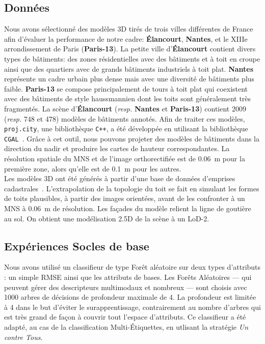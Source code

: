     \subsection*{Données}
        Nous avons sélectionné des modèles 3D tirés de trois villes différentes de France afin d'évaluer la performance de notre cadre: \textbf{\'Elancourt}, \textbf{Nantes}, et le XIIIe arrondissement de Paris (\textbf{Paris-13}).
        La petite ville d'\textbf{\'Elancourt} contient divers types de bâtiments: des zones résidentielles avec des bâtiments et à toit en croupe ainsi que des quartiers avec de grands bâtiments industriels à toit plat.
        \textbf{Nantes} représente un cadre urbain plus dense mais avec une diversité de bâtiments plus faible.
        \textbf{Paris-13} se compose principalement de tours à toit plat qui coexistent avec des bâtiments de style haussmannien dont les toits sont généralement très fragmentés.
        La scène d'\textbf{\'Elancourt} (\textit{resp.} \textbf{Nantes} et \textbf{Paris-13}) contient \num[locale=FR]{2009} (\textit{resp.} \num[locale=FR]{748} et \num[locale=FR]{478}) modèles de bâtiments annotés.
        Afin de traiter ces modèles, \verb!proj.city!, une bibliothèque \verb!C++!, a été développée en utilisant la bibliothèque \verb!CGAL!~\parencite{fabri2000design}.
        Grâce à cet outil, nous pouvons projeter des modèles de bâtiments dans la direction du nadir et produire les cartes de hauteur correspondantes.
        La résolution spatiale du MNS et de l'image orthorectifiée est de \SI[locale=FR]{0.06}{\m} pour la première zone, alors qu'elle est de \SI[locale=FR]{0.1}{\m} pour les autres.\\

        Les modèles 3D ont été générés à partir d'une base de données d'emprises cadastrales~\parencite{durupt2006automatic}.
        L'extrapolation de la topologie du toit se fait en simulant les formes de toits plausibles, à partir des images orientées, avant de les confronter à un MNS à \SI[locale=FR]{0,06}{\m} de résolution.
        Les façades du modèle relient la ligne de goutière au sol.
        On obtient une modélisation 2.5D de la scène à un LoD-2.

    \subsection*{Expériences Socles de base}
        Nous avons utilisé un classifieur de type Forêt aléatoire sur deux types d'attributs : un simple RMSE ainsi que les attributs de bases.
        Les Forêts Aléatoires --- qui peuvent gérer des descripteurs multimodaux et nombreux --- sont choisis avec \num[locale=FR]{1000} arbres de décisions de profondeur maximale de \num[locale=FR]{4}.
        La profondeur est limitée à 4 dans le but d'éviter le surapprentissage, contrairement au nombre d'arbres qui est très grand de façon à couvrir tout l'espace d'attributs.
        Ce classifieur a été adapté, au cas de la classification Multi-\'Etiquettes, en utlisant la stratégie \textit{Un contre Tous}.\\

